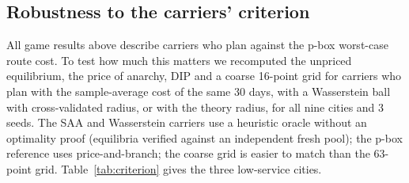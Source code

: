 \documentclass[preprint,11pt]{elsarticle}
\theoremstyle{definition}
\theoremstyle{remark}
\begin{document}
\subsection{Robustness to the carriers' criterion}\label{sec:res-crit}

All game results above describe carriers who plan against the p-box worst-case route cost. To test how much this matters we recomputed the unpriced equilibrium, the price of anarchy, DIP and a coarse 16-point grid for carriers who plan with the sample-average cost of the same 30 days, with a Wasserstein ball with cross-validated radius, or with the theory radius, for all nine cities and 3 seeds. The SAA and Wasserstein carriers use a heuristic oracle without an optimality proof (equilibria verified against an independent fresh pool); the p-box reference uses price-and-branch; the coarse grid is easier to match than the 63-point grid. Table~\ref{tab:criterion} gives the three low-service cities.
\end{document}
